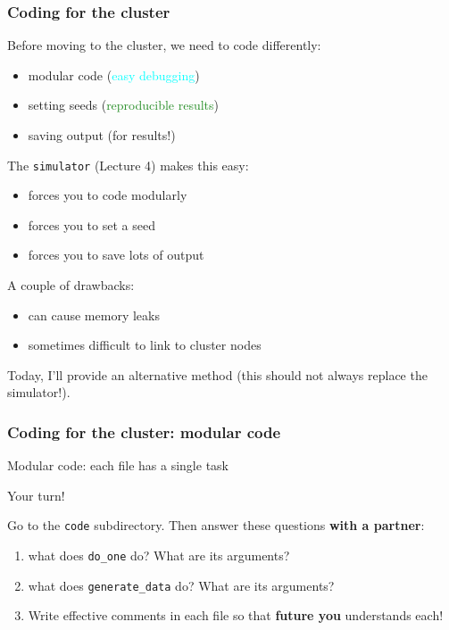 \documentclass[12pt, 
hyperref={colorlinks=true, linkcolor=BlueViolet, urlcolor=BlueViolet},dvipsnames]{beamer}
\begin{document}
\begin{frame}
\frametitle{Coding for the cluster}
Before moving to the cluster, we need to code differently: \vspace{-0.3cm} \pause
\begin{itemize}
\item modular code \pause (\textcolor{cyan}{easy debugging}) \pause
\item setting seeds \pause (\textcolor{ForestGreen}{reproducible results}) \pause
\item saving output \pause (\textcolor{BurntOrange}{for results!})
\end{itemize}

The \texttt{simulator} (Lecture 4) makes this easy: \vspace{-0.3cm} \pause
\begin{itemize}
\item forces you to code modularly \pause
\item forces you to set a seed \pause
\item forces you to save lots of output \pause
\end{itemize}

A couple of drawbacks: \vspace{-0.3cm} \pause
\begin{itemize}
\item can cause memory leaks \pause
\item sometimes difficult to link to cluster nodes \pause
\end{itemize}

Today, I'll provide an alternative method (this should not always replace the simulator!).
\end{frame}

\begin{frame}
\frametitle{Coding for the cluster: modular code}
Modular code: each file has a single task \pause

Your turn!

Go to the \texttt{code} subdirectory. Then answer these questions \textbf{with a partner}: \vspace{-0.3cm}
\begin{enumerate}
\item what does \texttt{do\_one} do? What are its arguments?
\item what does \texttt{generate\_data} do? What are its arguments?
\item Write effective comments in each file so that \textbf{future you} understands each!
\end{enumerate}
\end{frame}
\end{document}
